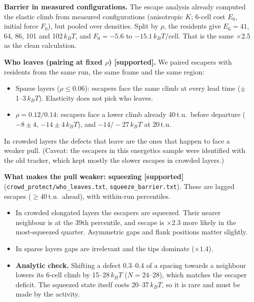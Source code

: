 \documentclass[11pt,a4paper]{article}
\newcommand{\kT}{k_BT}
\newcommand{\supp}{\textbf{\textcolor{green!50!black}{[supported]}}}
\begin{document}
\textbf{Barrier in measured configurations.} The escape analysis already computed the elastic climb from measured configurations (anisotropic $K$;
6-cell cost $E_6$, initial force $F_0$), but pooled over densities. Split by $\rho$, the residents give $E_6=41$, 64, 86, 101 and 102\,$\kT$, and
$F_0=-5.6$ to $-15.1\,\kT$/cell. That is the same $\times2.5$ as the clean calculation.

\textbf{Who leaves (pairing at fixed $\rho$) \supp.} We paired escapers with residents from the same run, the same frame and the same region:
\begin{itemize}
\item Sparse layers ($\rho\leq0.06$): escapers face the same climb at every lead time ($\pm$1--3\,$\kT$). Elasticity does not pick who leaves.
\item $\rho=0.12/0.14$: escapers face a lower climb already 40\,t.u.\ before departure ($-8\pm4$, $-14\pm4\,\kT$), and $-14/-27\,\kT$ at 20\,t.u.
\end{itemize}
In crowded layers the defects that leave are the ones that happen to face a weaker pull. (Caveat: the escapers in this energetics sample were identified with the old tracker, which kept mostly the slower escapes in crowded layers.)

\textbf{What makes the pull weaker: squeezing \supp} (\texttt{crowd\_protect/who\_leaves.txt}, \texttt{squeeze\_barrier.txt}). These are lagged escapes ($\geq40$\,t.u.\ ahead), with within-run percentiles.
\begin{itemize}
\item In crowded elongated layers the escapers are squeezed. Their nearer neighbour is at the 39th percentile, and escape is $\times2.3$ more likely in the most-squeezed quarter. Asymmetric gaps and flank positions matter slightly.
\item In sparse layers gaps are irrelevant and the tips dominate ($\times1.4$).
\item \textbf{Analytic check.} Shifting a defect 0.3--0.4 of a spacing towards a neighbour lowers its 6-cell climb by 15--28\,$\kT$ ($N=24$--28), which matches the escaper deficit. The squeezed state itself costs 20--37\,$\kT$, so it is rare and must be made by the activity.
\end{itemize}
\end{document}
